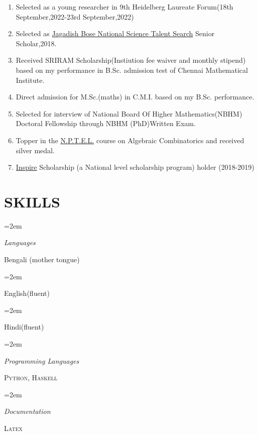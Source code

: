 \documentclass[paper=a4,fontsize=11pt]{scrartcl} %
\newlength{\spacebox}
\newcommand{\sepspace}{\vspace*{1em}}		%
\newcommand{\NewPart}[1]{\section*{\uppercase{#1}}}
\newcommand{\PersonalEntry}[2]{
		\noindent\hangindent=2em\hangafter=0 %
		\parbox{\spacebox}{        %
		\textit{#1}}		       %
		\hspace{1.5em} #2 \par}    %
\newcommand{\SkillsEntry}[2]{      %
		\noindent\hangindent=2em\hangafter=0 %
		\parbox{\spacebox}{        %
		\textit{#1}}			   %
		\hspace{1.5em} #2 \par}    %
\begin{document}
\begin{enumerate}
    \item Selected as a young researcher in 9th Heidelberg Laureate Forum(18th September,2022-23rd September,2022)
    \item Selected as \href{https://jbnsts.ac.in/}{Jagadish Bose National Science Talent Search} Senior Scholar,2018.
    \item Received SRIRAM Scholarship(Instiution fee waiver and monthly stipend)  based on my performance in B.Sc. admission test of Chennai Mathematical Institute.
    \item Direct admission for M.Sc.(maths) in C.M.I. based on my B.Sc. performance.
    \item Selected for interview of National Board Of Higher Mathematics(NBHM) Doctoral Fellowship through NBHM (PhD)Written Exam.
    \item Topper in the \href{https://swayam.gov.in/nc_details/NPTEL}{N.P.T.E.L.} course on Algebraic Combinatorics and received silver medal.
    \item \href{https://online-inspire.gov.in/}{Inspire} Scholarship (a National level scholarship program) holder (2018-2019) 
    

\end{enumerate}

\newpage

\NewPart{Skills}{}
\SkillsEntry{Languages}{Bengali (mother tongue)}
\SkillsEntry{}{English(fluent)}
\SkillsEntry{}{Hindi(fluent)}
\sepspace

\SkillsEntry{Programming Languages}{\textsc{Python}, \textsc{Haskell}}
\sepspace

\SkillsEntry{Documentation}{\textsc{Latex}}
\sepspace
\end{document}
